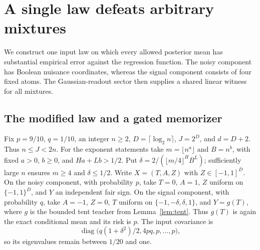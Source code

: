 \section{A single law defeats arbitrary mixtures}
\label{sec:relu-mixture-extension}

We construct one input law on which every allowed posterior mean has
substantial empirical error against the regression function. The noisy
component has Boolean nuisance coordinates, whereas the signal
component consists of four fixed atoms. The Gaussian-readout sector
then supplies a shared linear witness for all mixtures.

\subsection{The modified law and a gated memorizer}

Fix $p=9/10$, $q=1/10$, an integer $n\ge2$,
$D=\lceil\log_2n\rceil$, $J=2^D$, and $d=D+2$. Thus $n\le J<2n$.
For the exponent statements take $m=\lfloor n^a\rfloor$ and $B=n^b$,
with fixed $a>0$, $b\ge0$, and $Ha+Lb>1/2$. Put
$\delta=2/(\lfloor m/4\rfloor^H B^L)$; sufficiently large $n$
ensures $m\ge4$ and $\delta\le1/2$.
Write $X=(T,A,Z)$ with $Z\in[-1,1]^D$. On the noisy component,
with probability $p$, take $T=0$, $A=1$, $Z$ uniform on
$\{-1,1\}^D$, and $Y$ an independent fair sign. On the signal
component, with probability $q$, take $A=-1$, $Z=0$, $T$ uniform
on $\{-1,-\delta,\delta,1\}$, and $Y=g(T)$, where $g$ is the
bounded tent teacher from Lemma~\ref{lem:tent}. Thus $g(T)$ is again
the exact conditional mean and its risk is $p$. The input covariance is
\[
 \operatorname{diag}\bigl(q(1+\delta^2)/2,4pq,p,\ldots,p\bigr),
\]
so its eigenvalues remain between $1/20$ and one.

